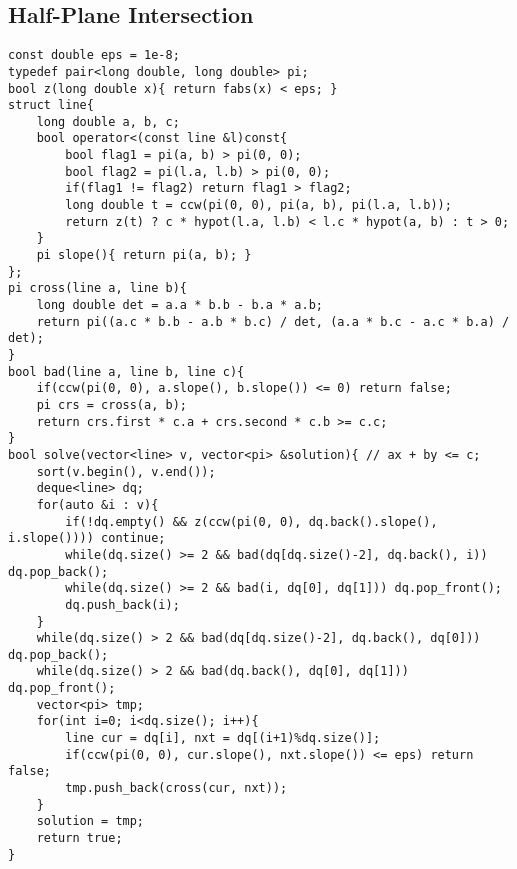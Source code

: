 \subsection{Half-Plane Intersection}
\begin{verbatim}
const double eps = 1e-8;
typedef pair<long double, long double> pi;
bool z(long double x){ return fabs(x) < eps; }
struct line{
	long double a, b, c;
	bool operator<(const line &l)const{
		bool flag1 = pi(a, b) > pi(0, 0);
		bool flag2 = pi(l.a, l.b) > pi(0, 0);
		if(flag1 != flag2) return flag1 > flag2;
		long double t = ccw(pi(0, 0), pi(a, b), pi(l.a, l.b));
		return z(t) ? c * hypot(l.a, l.b) < l.c * hypot(a, b) : t > 0;
	}
	pi slope(){ return pi(a, b); }
};
pi cross(line a, line b){
	long double det = a.a * b.b - b.a * a.b;
	return pi((a.c * b.b - a.b * b.c) / det, (a.a * b.c - a.c * b.a) / det);
}
bool bad(line a, line b, line c){
	if(ccw(pi(0, 0), a.slope(), b.slope()) <= 0) return false;
	pi crs = cross(a, b);
	return crs.first * c.a + crs.second * c.b >= c.c;
}
bool solve(vector<line> v, vector<pi> &solution){ // ax + by <= c;
	sort(v.begin(), v.end());
	deque<line> dq;
	for(auto &i : v){
		if(!dq.empty() && z(ccw(pi(0, 0), dq.back().slope(), i.slope()))) continue;
		while(dq.size() >= 2 && bad(dq[dq.size()-2], dq.back(), i)) dq.pop_back();
		while(dq.size() >= 2 && bad(i, dq[0], dq[1])) dq.pop_front();
		dq.push_back(i);
	}
	while(dq.size() > 2 && bad(dq[dq.size()-2], dq.back(), dq[0])) dq.pop_back();
	while(dq.size() > 2 && bad(dq.back(), dq[0], dq[1])) dq.pop_front();
	vector<pi> tmp;
	for(int i=0; i<dq.size(); i++){
		line cur = dq[i], nxt = dq[(i+1)%dq.size()];
		if(ccw(pi(0, 0), cur.slope(), nxt.slope()) <= eps) return false;
		tmp.push_back(cross(cur, nxt));
	}
	solution = tmp;
	return true;
}
\end{verbatim}